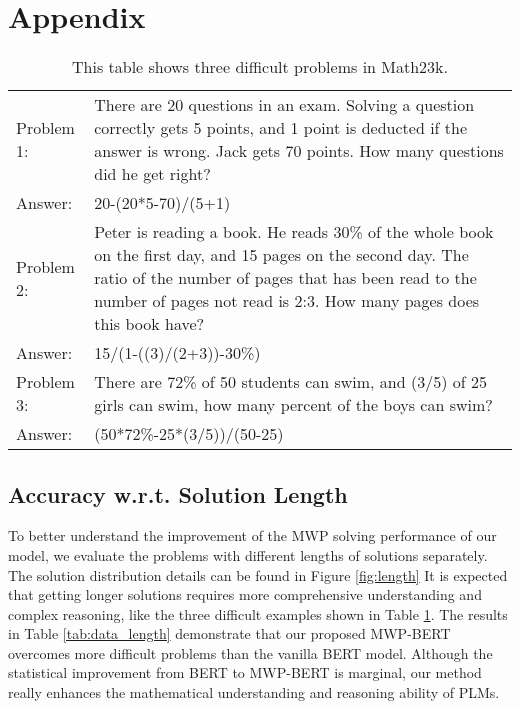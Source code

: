 \documentclass[11pt]{article}
\begin{document}
 



\clearpage
\appendix



\section{Appendix}





\begin{table}
\renewcommand\arraystretch{1.05}
\centering
\begin{tabular}{|p{2.1cm}<{\centering}|p{4.8cm}|}
\hline
Problem 1: & There are 20 questions in an exam. Solving a question correctly gets 5 points, and 1 point is deducted if the answer is wrong. Jack gets 70 points. How many questions did he get right? \\ 
Answer:       &  20-(20*5-70)/(5+1)    \\
\hline
Problem 2: & Peter is reading a book. He reads 30\% of the whole book on the first day, and 15 pages on the second day. The ratio of the number of pages that has been read to the number of pages not read is 2:3. How many pages does this book have? \\ 
Answer:       &  15/(1-((3)/(2+3))-30\%)    \\ 
\hline
Problem 3: &There are 72\% of 50 students can swim, and (3/5) of 25 girls can swim, how many percent of the boys can swim? \\
Answer:       &  (50*72\%-25*(3/5))/(50-25)    \\ 
\hline
\end{tabular}
\caption{This table shows three difficult problems in Math23k.}
\label{tab:data_difficult}
\end{table}

\subsection{Accuracy w.r.t. Solution Length }
To better understand the improvement of the MWP solving performance of our model, we evaluate the problems with different lengths of solutions separately. The solution distribution details can be found in Figure \ref{fig:length} It is expected that getting longer solutions requires more comprehensive understanding and complex reasoning, like the three difficult examples   shown in Table \ref{tab:data_difficult}. The results in Table \ref{tab:data_length} demonstrate that our proposed MWP-BERT overcomes more difficult problems than the vanilla BERT model. Although the statistical improvement from BERT to MWP-BERT is marginal, our method really enhances the mathematical understanding and reasoning ability of PLMs.
\end{document}
